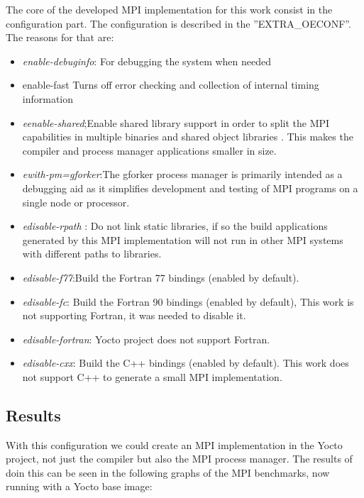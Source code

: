 The core of the developed MPI implementation for this work consist in the
configuration part. The configuration is described in the ''EXTRA\_OECONF''. 
The reasons for that are: 

\begin{itemize}
\item \textit{enable-debuginfo}: For debugging the system when needed
\item enable-fast Turns off error checking and collection of internal timing
information
\item \textit{eenable-shared};Enable shared library support in order to split the MPI
capabilities in multiple binaries and shared object libraries . This makes the
compiler and process manager applications smaller in size.
\item \textit{ewith-pm=gforker}:The gforker process manager is primarily intended as a
debugging aid as it simplifies development and testing of MPI programs on a
single node or processor.
\item \textit{edisable-rpath} : Do not link static libraries, if so the build
applications generated by this MPI implementation will not run in other MPI
systems with different paths to libraries.
\item \textit{edisable-f77}:Build the Fortran 77 bindings (enabled by default).
\item \textit{edisable-fc}: Build the Fortran 90 bindings (enabled by default),
This work is not supporting Fortran, it was needed to disable it.
\item \textit{edisable-fortran}: Yocto project does not support Fortran.
\item \textit{edisable-cxx}: Build the C++ bindings (enabled by default). This
work does not support C++ to generate a small MPI implementation.
\end{itemize}


\subsection{Results}

With this configuration we could create an MPI implementation in the Yocto
project, not just the compiler but also the MPI process manager. The results of
doin this can be seen in the following graphs of the MPI benchmarks, now
running with a Yocto base image: 

